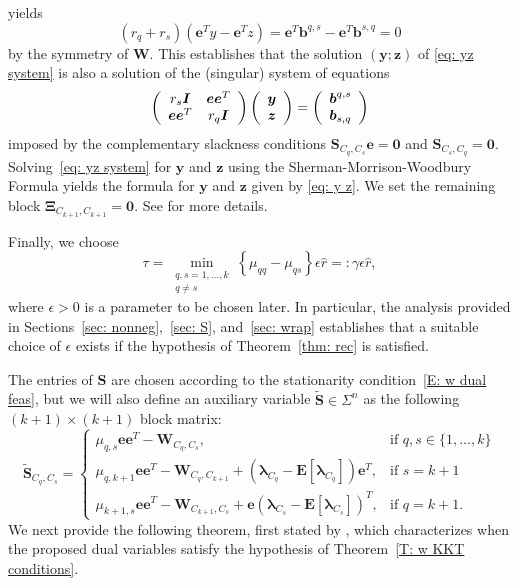 \documentclass[twoside,11pt]{article}
\renewcommand{\S}{\mathbf{S}}
\newcommand{\E}{\mathbf{E}}
\newcommand{\St}{\bs{\tilde S}}
\renewcommand{\b}{{\bs{b}}}
\newcommand{\e}{\bs {e}}
\newcommand{\bs}{\boldsymbol}
\newcommand{\y}{\bs {y}}
\newcommand{\W}{\bs {W}}
\newcommand{\z}{\bs{z}}
\newcommand{\0}{\bs{0}}
\newcommand{\vect}[1] {\ensuremath{\left(\begin{array}{c} #1 \end{array} \right)}} %
\newcommand{\mat}[1] {\ensuremath{ \left(\begin{array} #1 \end{array} \right)}} %
\newcommand{\branchdef}[1] {\ensuremath{ \left\{\begin{array}{rl} #1 \end{array} \right. }} %
\newcommand{\bra}[1]{\ensuremath{\left\{ #1 \right\}}} %
\newcommand{\eq}[1]{\(#1\)}
\begin{document}
{yields
\[
	(r_q + r_s)( \e^T y -  \e^T z) = \e^T \b^{q,s} - \e^T \b^{s,q}
	= 0
\]
by the symmetry of \eq{\W}. This establishes that the solution
\((\y; \z)\) of \eqref{eq: yz system}
is also a solution of the (singular) system of equations
\[
	\mat{{cc} r_s \I & \e\e^T  \\ \e\e^T & r_q \I }
	\vect{ \y \\ \z } = \vect{\b^{q,s} \\ \b_{s,q} }
\]
imposed by the complementary slackness conditions
${\S_{C_q, C_s} \e = \0}$ and ${\S_{C_s, C_q} = \0 }$.
Solving~\eqref{eq: yz system} for ${\y}$ and $\z$
using the Sherman-Morrison-Woodbury
Formula
yields the formula for $\y$ and $\z$ given by
\eqref{eq: y z}.
We set the remaining block $\bs\Xi_{C_{k+1}, C_{k+1} } = \0$.
See \citet[Section~4.2]{ames2014guaranteed} for more details.

Finally, we choose
\begin{equation} \label{eq: mu}
\tau = \min_{\substack{q,s=1,\dots, k \\ q \neq s }} \bra{\mu_{qq} - \mu_{qs}} \epsilon  \hat r =: \gamma\epsilon  \hat r,
\end{equation}
where \(\epsilon > 0\) is a parameter to be chosen later.
In particular, the analysis provided in Sections~\ref{sec: nonneg},~\ref{sec: S}, and~\ref{sec: wrap} establishes that
a suitable choice of $\epsilon$ exists if the hypothesis of
Theorem~\ref{thm: rec} is satisfied.

The entries of \(\S\) are chosen according to the stationarity condition~\eqref{E: w dual feas}, but we will also define
an auxiliary variable \(\St \in \Sigma^n\) as the following \((k+1)\times (k+1)\) block matrix:
\begin{equation} \label{e: tilde S def}
\St_{C_q, C_s} = \branchdef{
	\mu_{q,s}\e\e^T - \W_{C_q, C_s},  & \mbox{if } q, s \in \{1,\dots, k\} \\
	\mu_{q,k+1} \e\e^T - \W_{C_q, C_{k+1}} + (\bs\lambda_{C_q} - \E[\bs\lambda_{C_q}] )\e^T ,  & \mbox{if } s = {k+1}  \\
	\mu_{k+1,s} \e\e^T - \W_{C_{k+1}, C_s} + \e (\bs \lambda_{C_s} - \E[\bs\lambda_{C_s}] )^T,   & \mbox{if } q = {k+1} .
}
\end{equation}
We next provide the following theorem, first stated by \citet[Theorem~4.2]{ames2014guaranteed},
which characterizes when the proposed dual variables satisfy the hypothesis
of Theorem~\ref{T:  w KKT conditions}.

}
\end{document}
